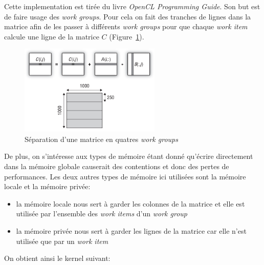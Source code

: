 Cette implementation est tirée du livre \textit{OpenCL Programming Guide}\autocite{openclguide}. 
Son but est de faire usage des \textit{work groups}. Pour cela on fait des tranches de lignes 
dans la matrice afin de les passer à différents \textit{work groups} pour que chaque \textit{work item} 
calcule une ligne de la matrice $C$ (Figure~\ref{fig:non_naive_implementation_principle}). 
\begin{figure}[h]
\begin{center}
    \includegraphics[width=0.6\textwidth]{../../resources/non_naive_implementation_principle.png}
    \caption{Séparation d'une matrice en quatres \textit{work groups}}
    \label{fig:non_naive_implementation_principle}
\end{center}
\end{figure}
De plus, on s'intéresse aux types de mémoire étant donné qu'écrire 
directement dans la mémoire globale causerait des contentions et donc des pertes de performances. 
Les deux autres types de mémoire ici utilisées sont la mémoire locale et la mémoire privée: 
\begin{itemize}
    \item la mémoire locale nous sert à garder les colonnes de la matrice et elle est utilisée par l'ensemble des
        \textit{work items} d'un \textit{work group}
    \item la mémoire privée nous sert à garder les lignes de la matrice car elle n'est utilisée que par un \textit{work
        item}
\end{itemize}
On obtient ainsi le kernel suivant:
